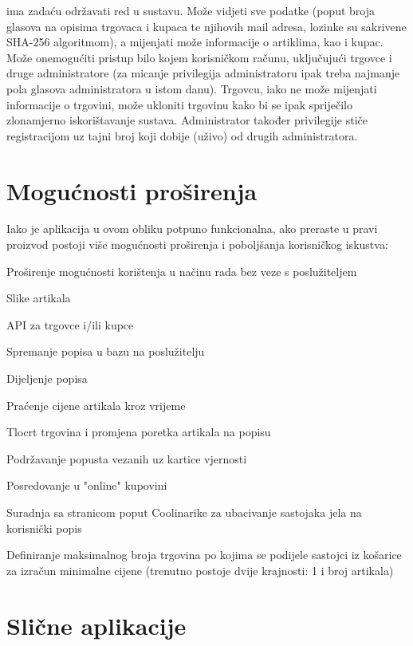      ima zadaću održavati red u sustavu. Može vidjeti sve podatke (poput broja glasova na opisima trgovaca i kupaca te njihovih mail adresa, lozinke su sakrivene SHA-256 algoritmom), a mijenjati može informacije o artiklima, kao i kupac. Može onemogućiti pristup bilo kojem korisničkom računu, uključujući trgovce i druge administratore (za micanje privilegija administratoru ipak treba najmanje pola glasova administratora u istom danu). Trgovcu, iako ne može mijenjati informacije o trgovini, može ukloniti trgovinu kako bi se ipak spriječilo zlonamjerno iskorištavanje sustava. Administrator također privilegije stiče registracijom uz tajni broj koji dobije (uživo) od drugih administratora. \\
    
    \section{Mogućnosti proširenja}
    
    Iako je aplikacija u ovom obliku potpuno funkcionalna, ako preraste u pravi proizvod postoji više mogućnosti proširenja i poboljšanja korisničkog iskustva:
    \begin{packed_item}
        \item Proširenje mogućnosti korištenja u načinu rada bez veze s poslužiteljem
        \item Slike artikala
        \item API za trgovce i/ili kupce
        \item Spremanje popisa u bazu na poslužitelju
        \item Dijeljenje popisa
        \item Praćenje cijene artikala kroz vrijeme
        \item Tlocrt trgovina i promjena poretka artikala na popisu
        \item Podržavanje popusta vezanih uz kartice vjernosti
        \item Posredovanje u "online" kupovini
        \item Suradnja sa stranicom poput Coolinarike za ubacivanje sastojaka jela na korisnički popis
        \item Definiranje maksimalnog broja trgovina po kojima se podijele sastojci iz košarice za izračun minimalne cijene (trenutno postoje dvije krajnosti: 1 i broj artikala)
    \end{packed_item}
    
    
    \section{Slične aplikacije}
    
